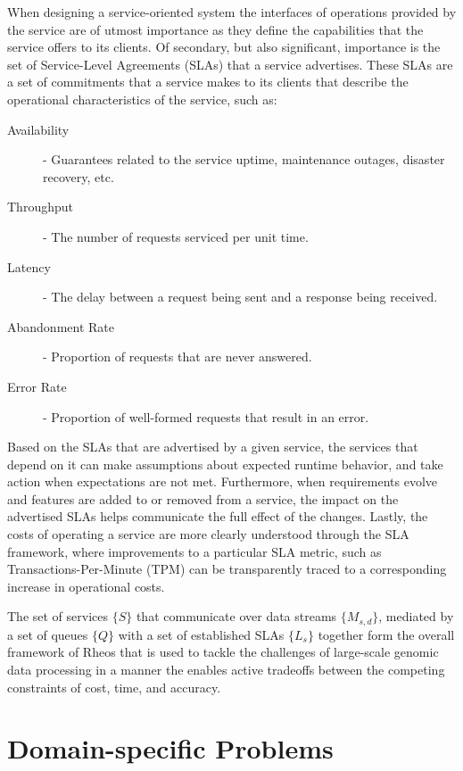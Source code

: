 When designing a service-oriented system the interfaces of operations provided by the service are of utmost importance as they define the capabilities that the service offers to its clients. Of secondary, but also significant, importance is the set of Service-Level Agreements (SLAs)\autocite{wieder2011service} that a service advertises. These SLAs are a set of commitments that a service makes to its clients that describe the operational characteristics of the service, such as:

\begin{description}
    \item [Availability] - Guarantees related to the service uptime, maintenance outages, disaster recovery, etc.
    \item [Throughput] - The number of requests serviced per unit time.
    \item [Latency] - The delay between a request being sent and a response being received.
    \item [Abandonment Rate] - Proportion of requests that are never answered.
    \item [Error Rate] - Proportion of well-formed requests that result in an error.
\end{description}

Based on the SLAs that are advertised by a given service, the services that depend on it can make assumptions about expected runtime behavior, and take action when expectations are not met. Furthermore, when requirements evolve and features are added to or removed from a service, the impact on the advertised SLAs helps communicate the full effect of the changes. Lastly, the costs of operating a service are more clearly understood through the SLA framework, where improvements to a particular SLA metric, such as Transactions-Per-Minute (TPM) can be transparently traced to a corresponding increase in operational costs.

The set of services $\{S\}$ that communicate over data streams $\{M_{s,d}\}$, mediated by a set of queues $\{Q\}$ with a set of established SLAs $\{L_s\}$ together form the overall framework of Rheos that is used to tackle the challenges of large-scale genomic data processing in a manner the enables active tradeoffs between the competing constraints of cost, time, and accuracy. 

\section{Domain-specific Problems}\label{sec:main_body_domain_specific_problems}

